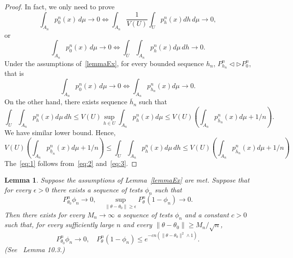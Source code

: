 \documentclass[review]{elsarticle}
\newtheorem{lemma}{Lemma}
\begin{document}
\begin{proof}
In fact, we only need to prove
\begin{equation}
\int_{A_n}p_0^n(x)\, d\mu \to 0 \Leftrightarrow \int_{A_n}\frac{1}{V(U)}\int_U p_h^n(x) dh \, d\mu \to 0,
\end{equation}
or
\begin{equation}\label{eq:1}
\int_{A_n}p_0^n(x)\, d\mu \to 0 \Leftrightarrow \int_{U}\int_{A_n} p_h^n(x) d\mu \, dh \to 0.
\end{equation}
Under the assumptions of~\ref{lemmaEx}, for every bounded sequence $h_n$, $P_{h_n}^n\triangleleft \triangleright P_{0}^n$, that is
\begin{equation}\label{eq:2}
\int_{A_n}p_0^n(x)\, d\mu \to 0 \Leftrightarrow \int_{A_n} p_{h_n}^n(x) d\mu  \to 0.
\end{equation}
On the other hand, there exists sequence $\overline{h}_n$ such that
\begin{equation}
\int_{U}\int_{A_n} p_h^n(x) d\mu \, dh
\leq V(U)\sup_{h\in U}\int_{A_n} p_h^n(x) d\mu
\leq V(U)(\int_{A_n}p^n_{\overline{h}_n}(x)d\mu +1/n).
\end{equation}
 We have similar lower bound. Hence,
\begin{equation}\label{eq:3}
 V(U)(\int_{A_n}p^n_{\underline{h}_n}(x)d\mu +1/n)
\leq \int_{U}\int_{A_n} p_h^n(x) d\mu \, dh
\leq V(U)(\int_{A_n}p^n_{\overline{h}_n}(x)d\mu +1/n)
\end{equation}
The~\eqref{eq:1} follows from~\eqref{eq:2} and~\eqref{eq:3}.
\end{proof}

\begin{lemma}\label{lemmaTest}
    Suppose the assumptions of Lemma~\ref{lemmaEx} are met. Suppose that for every $\epsilon>0$ there exists a sequence of tests $\phi_n$ such that
$$
P_{\theta_0}^n \phi_n \to 0,\quad \sup_{\|\theta-\theta_0\|\geq \epsilon}P_{\theta}^n (1-\phi_n)\to 0.
$$
Then there exists for every $M_n\to \infty$ a sequence of tests $\phi_n$ and a constant $c>0$ such that, for every sufficiently large $n$ and every $\|\theta-\theta_0\|\geq M_n /\sqrt{n}$,
$$
P_{\theta_0}^n\phi_n \to 0, \quad P_\theta^n (1-\phi_n)\leq e^{-cn(\|\theta-\theta_0\|^2\wedge 1)}.
$$
    (See~\cite{van2000asymptotic} Lemma 10.3.)
\end{lemma}
\end{document}
